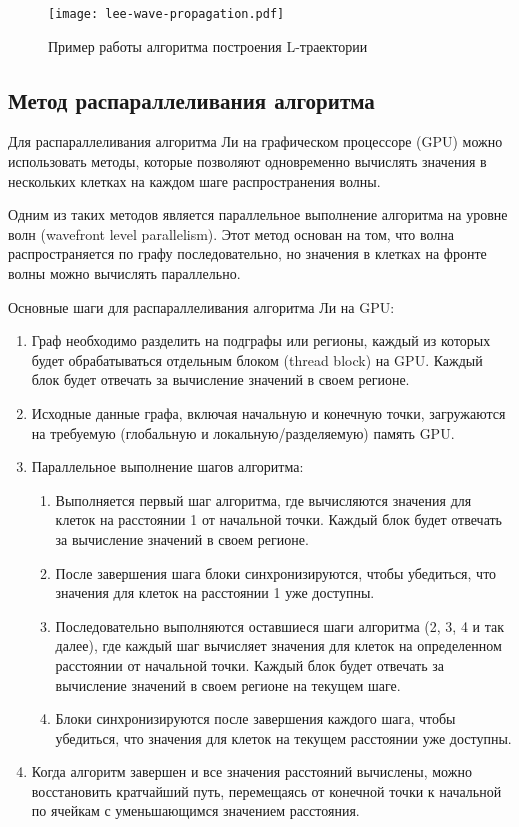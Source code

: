 \documentclass[a4paper, 12pt]{article}
\begin{document}
    \clearpage
    \begin{figure}[h!]
        \centering\texttt{[image: lee-wave-propagation.pdf]}
        \caption{Пример работы алгоритма построения L-траектории}	
        \label{lee}
    \end{figure}
        
    \subsection{Метод распараллеливания алгоритма}
    Для распараллеливания алгоритма Ли на графическом процессоре (GPU) можно использовать методы, которые позволяют одновременно вычислять значения в нескольких клетках на каждом шаге распространения волны.
    
    Одним из таких методов является параллельное выполнение алгоритма на уровне волн (wavefront level parallelism). Этот метод основан на том, что волна распространяется по графу последовательно, но значения в клетках на фронте волны можно вычислять параллельно.
    
    Основные шаги для распараллеливания алгоритма Ли на GPU:
    
    \begin{enumerate}
        \item Граф необходимо разделить на подграфы или регионы, каждый из которых будет обрабатываться отдельным блоком (thread block) на GPU. Каждый блок будет отвечать за вычисление значений в своем регионе.
        \item Исходные данные графа, включая начальную и конечную точки, загружаются на требуемую (глобальную и локальную/разделяемую) память GPU.
        \item Параллельное выполнение шагов алгоритма:
        \begin{enumerate}
            \item Выполняется первый шаг алгоритма, где вычисляются значения для клеток на расстоянии 1 от начальной точки. Каждый блок будет отвечать за вычисление значений в своем регионе.
            \item После завершения шага блоки синхронизируются, чтобы убедиться, что значения для клеток на расстоянии 1 уже доступны.
            \item Последовательно выполняются оставшиеся шаги алгоритма (2, 3, 4 и так далее), где каждый шаг вычисляет значения для клеток на определенном расстоянии от начальной точки. Каждый блок будет отвечать за вычисление значений в своем регионе на текущем шаге.
            \item Блоки синхронизируются после завершения каждого шага, чтобы убедиться, что значения для клеток на текущем расстоянии уже доступны.
        \end{enumerate}
        \item Когда алгоритм завершен и все значения расстояний вычислены, можно восстановить кратчайший путь, перемещаясь от конечной точки к начальной по ячейкам с уменьшающимся значением расстояния.
    \end{enumerate}
    
\end{document}

